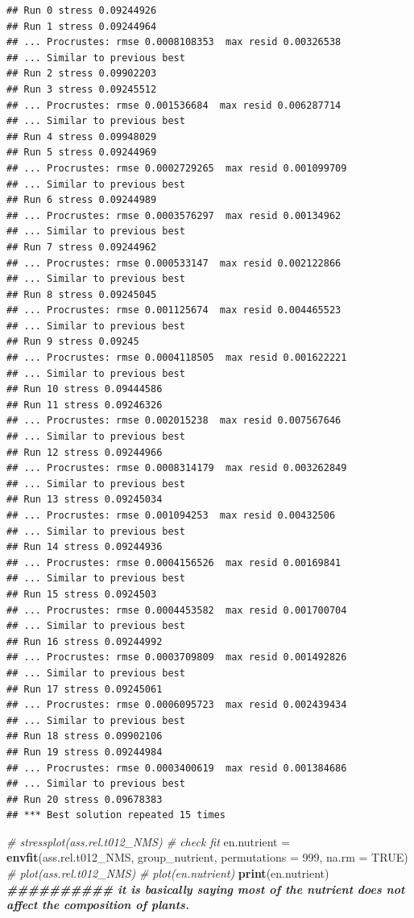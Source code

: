 \documentclass[
]{article}
\newenvironment{Shaded}{\begin{snugshade}}{\end{snugshade}}
\newcommand{\AttributeTok}[1]{\textcolor[rgb]{0.13,0.29,0.53}{#1}}
\newcommand{\CommentTok}[1]{\textcolor[rgb]{0.56,0.35,0.01}{\textit{#1}}}
\newcommand{\ConstantTok}[1]{\textcolor[rgb]{0.56,0.35,0.01}{#1}}
\newcommand{\DecValTok}[1]{\textcolor[rgb]{0.00,0.00,0.81}{#1}}
\newcommand{\DocumentationTok}[1]{\textcolor[rgb]{0.56,0.35,0.01}{\textbf{\textit{#1}}}}
\newcommand{\FunctionTok}[1]{\textcolor[rgb]{0.13,0.29,0.53}{\textbf{#1}}}
\newcommand{\NormalTok}[1]{#1}
\newcommand{\OtherTok}[1]{\textcolor[rgb]{0.56,0.35,0.01}{#1}}
\begin{document}
\begin{verbatim}
## Run 0 stress 0.09244926 
## Run 1 stress 0.09244964 
## ... Procrustes: rmse 0.0008108353  max resid 0.00326538 
## ... Similar to previous best
## Run 2 stress 0.09902203 
## Run 3 stress 0.09245512 
## ... Procrustes: rmse 0.001536684  max resid 0.006287714 
## ... Similar to previous best
## Run 4 stress 0.09948029 
## Run 5 stress 0.09244969 
## ... Procrustes: rmse 0.0002729265  max resid 0.001099709 
## ... Similar to previous best
## Run 6 stress 0.09244989 
## ... Procrustes: rmse 0.0003576297  max resid 0.00134962 
## ... Similar to previous best
## Run 7 stress 0.09244962 
## ... Procrustes: rmse 0.000533147  max resid 0.002122866 
## ... Similar to previous best
## Run 8 stress 0.09245045 
## ... Procrustes: rmse 0.001125674  max resid 0.004465523 
## ... Similar to previous best
## Run 9 stress 0.09245 
## ... Procrustes: rmse 0.0004118505  max resid 0.001622221 
## ... Similar to previous best
## Run 10 stress 0.09444586 
## Run 11 stress 0.09246326 
## ... Procrustes: rmse 0.002015238  max resid 0.007567646 
## ... Similar to previous best
## Run 12 stress 0.09244966 
## ... Procrustes: rmse 0.0008314179  max resid 0.003262849 
## ... Similar to previous best
## Run 13 stress 0.09245034 
## ... Procrustes: rmse 0.001094253  max resid 0.00432506 
## ... Similar to previous best
## Run 14 stress 0.09244936 
## ... Procrustes: rmse 0.0004156526  max resid 0.00169841 
## ... Similar to previous best
## Run 15 stress 0.0924503 
## ... Procrustes: rmse 0.0004453582  max resid 0.001700704 
## ... Similar to previous best
## Run 16 stress 0.09244992 
## ... Procrustes: rmse 0.0003709809  max resid 0.001492826 
## ... Similar to previous best
## Run 17 stress 0.09245061 
## ... Procrustes: rmse 0.0006095723  max resid 0.002439434 
## ... Similar to previous best
## Run 18 stress 0.09902106 
## Run 19 stress 0.09244984 
## ... Procrustes: rmse 0.0003400619  max resid 0.001384686 
## ... Similar to previous best
## Run 20 stress 0.09678383 
## *** Best solution repeated 15 times
\end{verbatim}

\begin{Shaded}
\begin{Highlighting}[]
\CommentTok{\# stressplot(ass.rel.t012\_NMS) \# check fit}
\NormalTok{en.nutrient }\OtherTok{=} \FunctionTok{envfit}\NormalTok{(ass.rel.t012\_NMS, group\_nutrient, }\AttributeTok{permutations =} \DecValTok{999}\NormalTok{, }\AttributeTok{na.rm =} \ConstantTok{TRUE}\NormalTok{)}
\CommentTok{\# plot(ass.rel.t012\_NMS) }
\CommentTok{\# plot(en.nutrient)}
\FunctionTok{print}\NormalTok{(en.nutrient) }\DocumentationTok{\#\#\#\#\#\#\#\#\#\# it is basically saying most of the nutrient does not affect the composition of plants.}
\end{Highlighting}
\end{Shaded}
\end{document}
